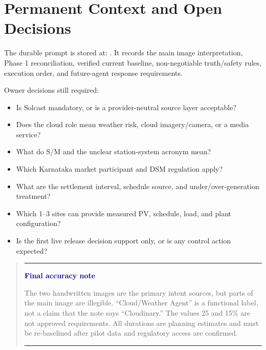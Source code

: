 \documentclass[11pt,a4paper]{article}
\newenvironment{callout}[2][paleBlue]
  {\begin{quote}\color{ink}\noindent
   \textcolor{blue}{\rule{2.5pt}{12pt}}\hspace{6pt}
   \textbf{\textcolor{navy}{#2}}\par\smallskip}
  {\par\smallskip\textcolor{grid}{\rule{\linewidth}{0.4pt}}\end{quote}}
\begin{document}
\section{Permanent Context and Open Decisions}

The durable prompt is stored at:
.
It records the main image interpretation, Phase 1 reconciliation, verified current baseline,
non-negotiable truth/safety rules, execution order, and future-agent response requirements.

Owner decisions still required:

\begin{itemize}
  \item Is Solcast mandatory, or is a provider-neutral source layer acceptable?
  \item Does the cloud role mean weather risk, cloud imagery/camera, or a media service?
  \item What do S/M and the unclear station-system acronym mean?
  \item Which Karnataka market participant and DSM regulation apply?
  \item What are the settlement interval, schedule source, and under/over-generation treatment?
  \item Which 1--3 sites can provide measured PV, schedule, load, and plant configuration?
  \item Is the first live release decision support only, or is any control action expected?
\end{itemize}

\begin{callout}[paleAmber]{Final accuracy note}
The two handwritten images are the primary intent sources, but parts of the main image are
illegible. ``Cloud/Weather Agent'' is a functional label, not a claim that the note says
``Cloudinary.'' The values 25 and 15\% are not approved requirements. All durations are planning
estimates and must be re-baselined after pilot data and regulatory access are confirmed.
\end{callout}
\end{document}
